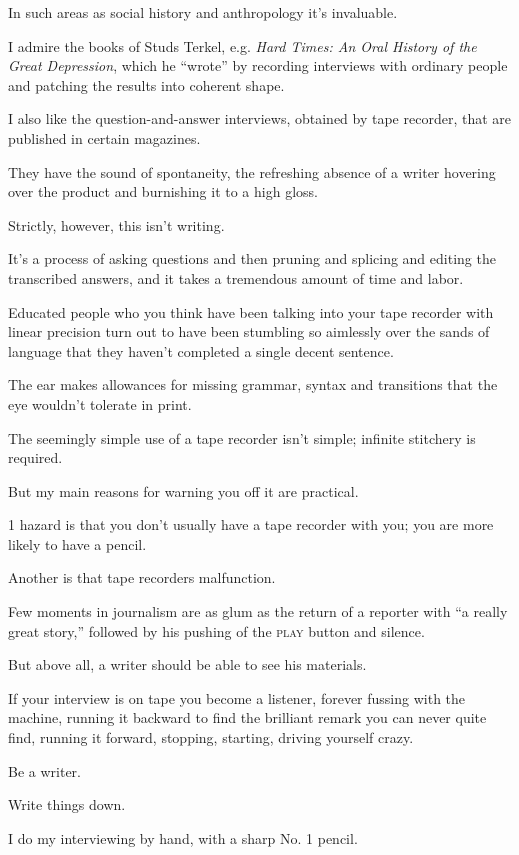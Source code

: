 \documentclass{book}
\numberwithin{equation}{section}
\begin{document}
In such areas as social history and anthropology it's invaluable.

I admire the books of Studs Terkel, e.g. \textit{Hard Times: An Oral History of the Great Depression}, which he ``wrote'' by recording interviews with ordinary people and patching the results into coherent shape.

I also like the question-and-answer interviews, obtained by tape recorder, that are published in certain magazines.

They have the sound of spontaneity, the refreshing absence of a writer hovering over the product and burnishing it to a high gloss.

%
Strictly, however, this isn't writing.

It's a process of asking questions and then pruning and splicing and editing the transcribed answers, and it takes a tremendous amount of time and labor.

Educated people who you think have been talking into your tape recorder with linear precision turn out to have been stumbling so aimlessly over the sands of language that they haven't completed a single decent sentence.

The ear makes allowances for missing grammar, syntax and transitions that the eye wouldn't tolerate in print.

The seemingly simple use of a tape recorder isn't simple; infinite stitchery is required.

%
But my main reasons for warning you off it are practical.

1 hazard is that you don't usually have a tape recorder with you; you are more likely to have a pencil.

Another is that tape recorders malfunction.

Few moments in journalism are as glum as the return of a reporter with ``a really great story,'' followed by his pushing of the \textsc{play} button and silence.

But above all, a writer should be able to see his materials.

If your interview is on tape you become a listener, forever fussing with the machine, running it backward to find the brilliant remark you can never quite find, running it forward, stopping, starting, driving yourself crazy.

Be a writer.

Write things down.

%
I do my interviewing by hand, with a sharp No. 1 pencil.
\end{document}
